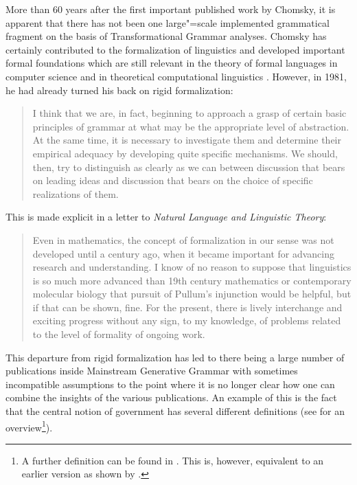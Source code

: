 More than 60 years after the first important published work by Chomsky, it is apparent that there has not been
one large"=scale implemented grammatical fragment on the basis of Transformational Grammar analyses. Chomsky
has certainly contributed to the formalization of linguistics and developed important formal foundations which
are still relevant in the theory of formal languages in computer science and
in theoretical computational linguistics \citep{Chomsky59a-u}. However, in 1981, he had already turned his back on rigid
formalization:
\begin{quote}
I think that we are, in fact, beginning to approach a grasp of certain 
basic principles of grammar at what may be the appropriate level of abstraction. At the same time, 
it is necessary to investigate them and determine their empirical adequacy by developing quite specific mechanisms.
We should, then, try to distinguish as clearly as we can between discussion that bears on leading ideas and
discussion that bears on the choice of specific realizations of them. \citep*[--3]{Chomsky81a}
\end{quote}
\pagebreak

This is made explicit in a letter to \emph{Natural Language and Linguistic Theory}:
\begin{quote}
Even in mathematics, the concept of formalization in our sense was not
developed until a century ago, when it became important for advancing research
and understanding. I know of no reason to suppose that linguistics is so much
more advanced than 19th century mathematics or contemporary molecular
biology that pursuit of Pullum's injunction would be helpful, but if that can be
shown, fine. For the present, there is lively interchange and exciting progress
without any sign, to my knowledge, of problems related to the level of formality
of ongoing work. \citep[]{Chomsky90a}
\end{quote}
This departure from rigid formalization has led to there being a large number of publications inside
Mainstream Generative Grammar with sometimes incompatible assumptions to the point where it is no longer clear
how one can combine the insights of the various publications. 
An example of this is the fact that the central notion of government has several different definitions
(see \citealp{AS83a} for an overview\footnote{%
A further definition can be found in . This is, however, equivalent to an earlier version as shown
by \citet[--106]{PP86a}.%
}).

